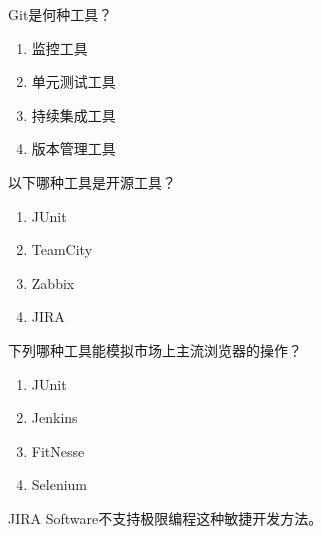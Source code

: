 \begin{problem}
	Git是何种工具？
    \vspace{-0.8em}
    \begin{multicols}{4}
        \begin{enumerate}[label=\Alph*.]
            \item 监控工具
            \item 单元测试工具
            \item 持续集成工具
            \item 版本管理工具
        \end{enumerate}
    \end{multicols}
    \vspace{-1em}
\end{problem}


\begin{problem}
	以下哪种工具是开源工具？
    \vspace{-0.8em}
    \begin{multicols}{4}
        \begin{enumerate}[label=\Alph*.]
            \item JUnit
            \item TeamCity
            \item Zabbix
            \item JIRA
        \end{enumerate}
    \end{multicols}
    \vspace{-1em}
\end{problem}


\begin{problem}
	下列哪种工具能模拟市场上主流浏览器的操作？
    \vspace{-0.8em}
    \begin{multicols}{4}
        \begin{enumerate}[label=\Alph*.]
            \item JUnit
            \item Jenkins
            \item FitNesse
            \item Selenium
        \end{enumerate}
    \end{multicols}
    \vspace{-1em}
\end{problem}


\begin{problem}
	JIRA Software不支持极限编程这种敏捷开发方法。
\end{problem}


